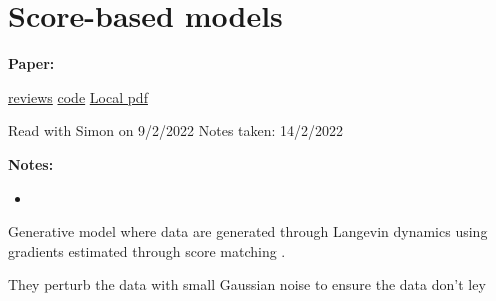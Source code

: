 \clearpage

\section{Score-based models}\label{sec:scorebased}

\begin{notebox}
\textbf{Paper: } 
\vspace{5pt}

\href{https://papers.nips.cc/paper/2019/file/3001ef257407d5a371a96dcd947c7d93-Reviews.html}{reviews}
\hspace{1cm}
\href{https://github.com/yang-song/score_sde_pytorch}{code}
\hspace{1cm}
\href{run:/home/magda/Dropbox/Zot/Song_Ermon_2020_Generative Modeling by Estimating Gradients of the Data Distribution.pdf}{Local pdf}
\vspace{3pt}

Read with Simon on 9/2/2022
\hfill Notes taken: 14/2/2022 
\end{notebox}

\begin{notebox}[colback=red!5]
\tldr 
\end{notebox}

\begin{notebox}[colback=yellow!5]
\textbf{Notes:} 
\begin{itemize}[nosep]
\item 
\end{itemize}
\end{notebox}


Generative model where data are generated through Langevin dynamics \parencite{welling_bayesian_nodate} using gradients estimated through score matching \parencite{hyvarinen_estimation_nodate}.

They perturb the data with small Gaussian noise to ensure the data don't ley 
